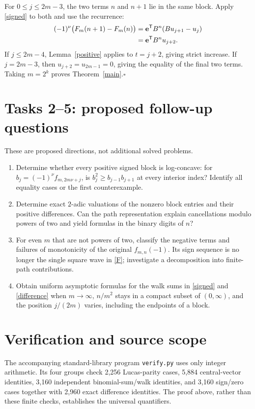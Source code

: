 \documentclass[11pt]{article}
\newcommand{\e}{\mathbf e}
\begin{document}
For $0\le j\le2m-3$, the two terms $n$ and $n+1$ lie in
the same block. Apply \eqref{signed} to both and use the recurrence:
\begin{align}
 (-1)^\nu\bigl(F_m(n+1)-F_m(n)\bigr)
 &=\e^{\mathsf T}B^n(Bu_{j+1}-u_j)\notag\\
 &=\e^{\mathsf T}B^n u_{j+2}.\label{difference}
\end{align}
If $j\le2m-4$, Lemma~\ref{positive} applies to $t=j+2$,
giving strict increase. If $j=2m-3$, then $u_{j+2}=u_{2m-1}=0$,
giving the equality of the final two terms. Taking $m=2^k$
proves Theorem~\ref{main}.\hfill$\square$

\section*{Tasks 2--5: proposed follow-up questions}
These are proposed directions, not additional solved problems.
\begin{enumerate}[label=\textbf{Task \arabic*:},start=2,leftmargin=*]
\item Determine whether every positive signed block is log-concave:
for $b_j=(-1)^\nu f_{m,2m\nu+j}$, is
$b_j^2\ge b_{j-1}b_{j+1}$ at every interior index? Identify all
equality cases or the first counterexample.
\item Determine exact $2$-adic valuations of the nonzero block
entries and their positive differences. Can the path representation
explain cancellations modulo powers of two and yield formulas in
the binary digits of $n$?
\item For even $m$ that are not powers of two, classify the negative
terms and failures of monotonicity of the original $f_{m,n}(-1)$.
Its sign sequence is no longer the single square wave in \eqref{F};
investigate a decomposition into finite-path contributions.
\item Obtain uniform asymptotic formulas for the walk sums in
\eqref{signed} and \eqref{difference} when $m\to\infty$,
$n/m^2$ stays in a compact subset of $(0,\infty)$, and the
position $j/(2m)$ varies, including the endpoints of a block.
\end{enumerate}

\section*{Verification and source scope}
The accompanying standard-library program \texttt{verify.py} uses only
integer arithmetic. Its four groups check 2,256 Lucas-parity cases,
5,884 central-vector identities, 3,160 independent binomial-sum/walk
identities, and 3,160 sign/zero cases together with 2,960 exact difference
identities. The proof above, rather than these finite checks, establishes
the universal quantifiers.
\end{document}
